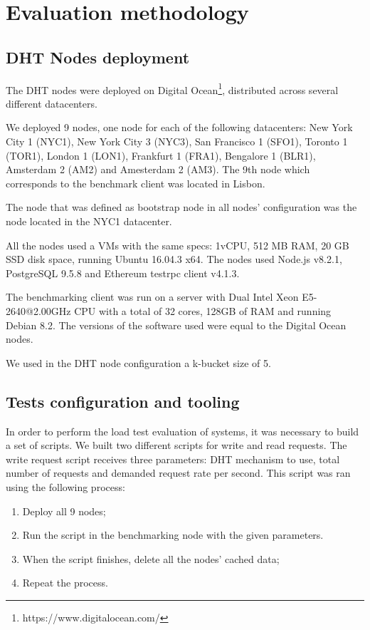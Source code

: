 \section{Evaluation methodology}
\label{section:methodology}

\subsection{DHT Nodes deployment}


The DHT nodes were deployed on Digital Ocean\footnote{https://www.digitalocean.com/}, distributed across several different datacenters.

We deployed 9 nodes, one node for each of the following datacenters: New York City 1 (NYC1), New York City 3 (NYC3), San Francisco 1 (SFO1), Toronto 1 (TOR1), London 1 (LON1), Frankfurt 1 (FRA1), Bengalore 1 (BLR1), Amsterdam 2 (AM2) and Amesterdam 2 (AM3).
The 9th node which corresponds to the benchmark client was located in Lisbon.

The node that was defined as bootstrap node in all nodes' configuration was the node located in the NYC1 datacenter.

All the nodes used a \acp{VM} with the same specs: 1vCPU, 512 MB RAM, 20 GB SSD disk space, running Ubuntu 16.04.3 x64.
The nodes used Node.js v8.2.1, PostgreSQL 9.5.8 and Ethereum testrpc client v4.1.3.

The benchmarking client was run on a server with Dual Intel Xeon E5-2640@2.00GHz CPU with a total of 32 cores, 128GB of RAM and running Debian 8.2.
The versions of the software used were equal to the Digital Ocean nodes.

We used in the DHT node configuration a k-bucket size of 5.

\subsection{Tests configuration and tooling}

In order to perform the load test evaluation of systems, it was necessary to build a set of scripts.
We built two different scripts for write and read requests.
The write request script receives three parameters: DHT mechanism to use, total number of requests and demanded request rate per second.
This script was ran using the following process:

\begin{enumerate}
  \item Deploy all 9 nodes;
  \item Run the script in the benchmarking node with the given parameters.
  \item When the script finishes, delete all the nodes' cached data;
  \item Repeat the process.
\end{enumerate}

